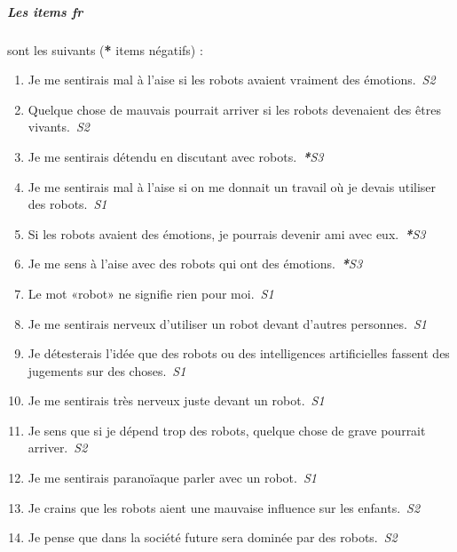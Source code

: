\subparagraph{Les items \textit{fr}} sont les suivants (\textbf{*} items négatifs) : 
\begin{enumerate}
    \item Je me sentirais mal à l'aise si les robots avaient vraiment des émotions.~\textit{S2}
    \item Quelque chose de mauvais pourrait arriver si les robots devenaient des êtres vivants.~\textit{S2}
    \item Je me sentirais détendu en discutant avec robots.~\textit{\textbf{*}S3}
    \item Je me sentirais mal à l'aise si on me donnait un travail où je devais utiliser des robots.~\textit{S1}
    \item Si les robots avaient des émotions, je pourrais devenir ami avec eux.~\textit{\textbf{*}S3}
    \item Je me sens à l'aise avec des robots qui ont des émotions.~\textit{\textbf{*}S3}	
    \item Le mot «robot» ne signifie rien pour moi.~\textit{S1}
    \item Je me sentirais nerveux d'utiliser un robot devant d'autres personnes.~\textit{S1}
    \item Je détesterais l'idée que des robots ou des intelligences artificielles fassent des jugements sur des choses.~\textit{S1}
    \item Je me sentirais très nerveux juste devant un robot.~\textit{S1}
    \item Je sens que si je dépend trop des robots, quelque chose de grave pourrait arriver.~\textit{S2}
    \item Je me sentirais paranoïaque parler avec un robot.~\textit{S1}
    \item Je crains que les robots aient une mauvaise influence sur les enfants.~\textit{S2}
    \item Je pense que dans la société future sera dominée par des robots.~\textit{S2}
\end{enumerate}

